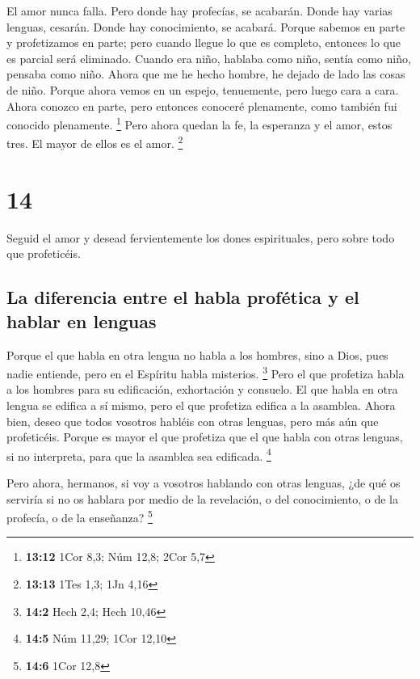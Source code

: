  El amor nunca falla. Pero donde hay profecías, se
acabarán. Donde hay varias lenguas, cesarán. Donde hay conocimiento, se
acabará.  Porque sabemos en parte y profetizamos en parte;
 pero cuando llegue lo que es completo, entonces lo que
es parcial será eliminado.  Cuando era niño, hablaba como
niño, sentía como niño, pensaba como niño. Ahora que me he hecho hombre,
he dejado de lado las cosas de niño.  Porque ahora vemos
en un espejo, tenuemente, pero luego cara a cara. Ahora conozco en
parte, pero entonces conoceré plenamente, como también fui conocido
plenamente. \footnote{\textbf{13:12} 1Cor 8,3; Núm 12,8; 2Cor 5,7}
 Pero ahora quedan la fe, la esperanza y el amor, estos
tres. El mayor de ellos es el amor. \footnote{\textbf{13:13} 1Tes 1,3;
  1Jn 4,16}

\hypertarget{section-13}{%
\section{14}\label{section-13}}

 Seguid el amor y desead fervientemente los dones
espirituales, pero sobre todo que profeticéis.

\hypertarget{la-diferencia-entre-el-habla-profuxe9tica-y-el-hablar-en-lenguas}{%
\subsection{La diferencia entre el habla profética y el hablar en
lenguas}\label{la-diferencia-entre-el-habla-profuxe9tica-y-el-hablar-en-lenguas}}

 Porque el que habla en otra lengua no habla a los
hombres, sino a Dios, pues nadie entiende, pero en el Espíritu habla
misterios. \footnote{\textbf{14:2} Hech 2,4; Hech 10,46} 
Pero el que profetiza habla a los hombres para su edificación,
exhortación y consuelo.  El que habla en otra lengua se
edifica a sí mismo, pero el que profetiza edifica a la asamblea.
 Ahora bien, deseo que todos vosotros habléis con otras
lenguas, pero más aún que profeticéis. Porque es mayor el que profetiza
que el que habla con otras lenguas, si no interpreta, para que la
asamblea sea edificada. \footnote{\textbf{14:5} Núm 11,29; 1Cor 12,10}

 Pero ahora, hermanos, si voy a vosotros hablando con
otras lenguas, ¿de qué os serviría si no os hablara por medio de la
revelación, o del conocimiento, o de la profecía, o de la enseñanza?
\footnote{\textbf{14:6} 1Cor 12,8}


